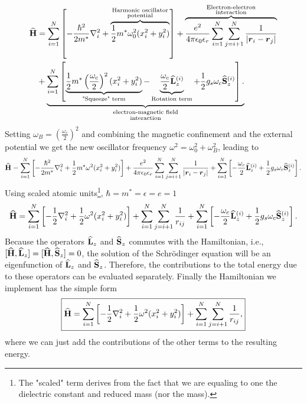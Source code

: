 \begin{align}
{\bf\widehat{H}} &= \sum_{i=1}^{N} \left[-\frac{\hbar^2}{2m^*}\nabla^{2}_{i} + \overbrace{\frac{1}{2} m^* \omega_{0}^{2}(x_{i}^{2} + y_{i}^{2})}^{\begin{smallmatrix}\text{Harmonic oscillator}\\ \text{potential}\end{smallmatrix}}\right] + \overbrace{\frac{e^2}{4 \pi \epsilon_0 \epsilon_r} \sum_{i=1}^{N} \sum_{j=i+1}^{N} \frac{1}{|\boldsymbol{r}_i - \boldsymbol{r}_j|}}^{\begin{smallmatrix}\text{Electron-electron}\\ \text{interaction} \end{smallmatrix}}\\ \nonumber
&  + \underbrace{\sum_{i=1}^{N} \left[\underbrace{\frac{1}{2} m^* \left(\frac{\omega_c}{2}\right)^2 (x_{i}^2 + y_{i}^2)}_{\text{"Squeeze" term}} - \underbrace{\frac{\omega_c}{2} {\bf\widehat{L}}_{z}^{(i)}}_{\text{Rotation term}} + \frac{1}{2}g_s \omega_c {\bf\widehat{S}}_{z}^{(i)}\right].}_{\begin{smallmatrix} \text{electron-magnetic field}\\ \text{interaction}\end{smallmatrix}}
\end{align}
Setting $\omega_B = \left(\frac{\omega_c}{2}\right)^2$ and combining the magnetic confinement and the external potential we get the new oscillator frequency $\omega^2 = \omega_{0}^{2} + \omega_{B}^2$, leading to
\begin{equation}
{\bf\widehat{H}} = \sum_{i=1}^{N} \left[-\frac{\hbar^2}{2m^*}\nabla^{2}_{i} + \frac{1}{2} m^* \omega^{2}(x_{i}^{2} + y_{i}^{2})\right] + \frac{e^2}{4 \pi \epsilon_0 \epsilon_r} \sum_{i=1}^{N} \sum_{j=i+1}^{N} \frac{1}{|\boldsymbol{r}_i - \boldsymbol{r}_j|}  + \sum_{i=1}^{N} \left[- \frac{\omega_c}{2} {\bf\widehat{L}}_{z}^{(i)} + \frac{1}{2}g_s \omega_c {\bf\widehat{S}}_{z}^{(i)}\right].
\end{equation}
Using scaled atomic units\footnote{The "scaled" term derives from the fact that we are equaling to one the dielectric constant and reduced mass (nor the mass).}, $\hbar = m^* = \epsilon = e = 1$
\begin{equation}
{\bf\widehat{H}} = \sum_{i=1}^{N} \left[-\frac{1}{2}\nabla^{2}_{i} + \frac{1}{2} \omega^{2}(x_{i}^{2} + y_{i}^{2})\right] + \sum_{i=1}^{N} \sum_{j=i+1}^{N} \frac{1}{r_{ij}}  + \sum_{i=1}^{N} \left[- \frac{\omega_c}{2} {\bf\widehat{L}}_{z}^{(i)} + \frac{1}{2}g_s \omega_c {\bf\widehat{S}}_{z}^{(i)}\right].
\end{equation}
Because the operators ${\bf\widehat{L}}_z$ and ${\bf\widehat{S}}_z$ commutes with the Hamiltonian, i.e., $[{\bf\widehat{H}}, {\bf\widehat{L}}_z] = [{\bf\widehat{H}}, {\bf\widehat{S}}_z] = 0$, the solution of the Schr\"odinger equation will be an eigenfunction of ${\bf\widehat{L}}_z$ and ${\bf\widehat{S}}_z$. Therefore, the contributions to the total energy due to these operators can be evaluated separately. Finally the Hamiltonian we implement has the simple form
\begin{equation}
\boxed{{\bf\widehat{H}} = \sum_{i=1}^{N} \left[-\frac{1}{2}\nabla^{2}_{i} + \frac{1}{2} \omega^{2}(x_{i}^{2} + y_{i}^{2})\right] + \sum_{i=1}^{N} \sum_{j=i+1}^{N} \frac{1}{r_{ij}},}
\end{equation}
where we can just add the contributions of the other terms to the resulting energy.


